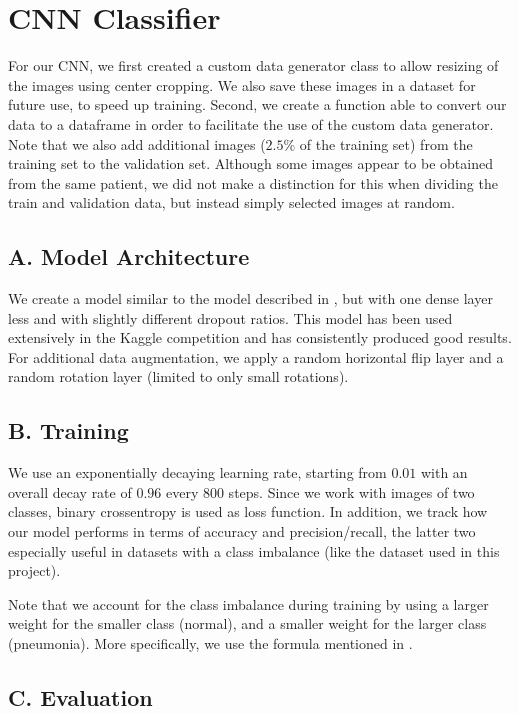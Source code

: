 \section{CNN Classifier}

For our CNN, we first created a custom data generator class to allow resizing of the images using center cropping. We also save these images in a dataset for future use, to speed up training.
Second, we create a function able to convert our data to a dataframe in order to facilitate the use of the custom data generator. Note that we also add additional images ($2.5\%$ of the training set) from the training set to the validation set. Although some images appear to be obtained from the same patient, we did not make a distinction for this when dividing the train and validation data, but instead simply selected images at random.

\subsection*{A. Model Architecture}

We create a model similar to the model described in \cite{keras}, but with one dense layer less and with slightly different dropout ratios. This model has been used extensively in the Kaggle competition \cite{Kermany2018-ms} and has consistently produced good results. For additional data augmentation, we apply a random horizontal flip layer and a random rotation layer (limited to only small rotations).

\subsection*{B. Training}


We use an exponentially decaying learning rate, starting from $0.01$ with an overall decay rate of $0.96$ every 800 steps.
Since we work with images of two classes, binary crossentropy is used as loss function. In addition, we track how our model performs in terms of accuracy and precision/recall, the latter two especially useful in datasets with a class imbalance (like the dataset used in this project).

Note that we account for the class imbalance during training by using a larger weight for the smaller class (normal), and a smaller weight for the larger class (pneumonia). More specifically, we use the formula mentioned in \cite{tf}.

\subsection*{C. Evaluation}

